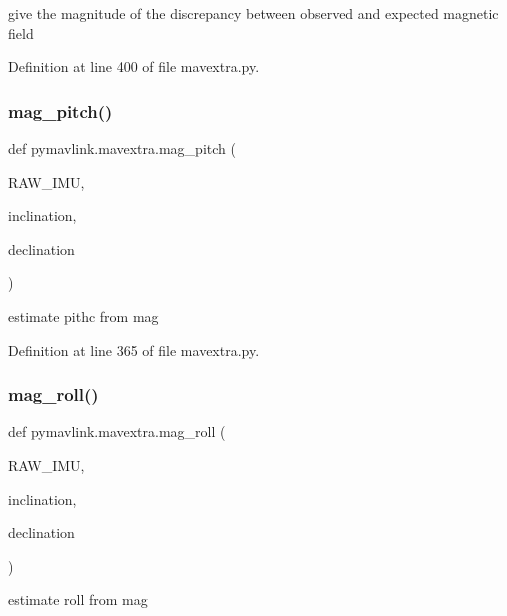\begin{DoxyVerb}give the magnitude of the discrepancy between observed and expected magnetic field\end{DoxyVerb}
 

Definition at line 400 of file mavextra.\+py.

\mbox{\label{namespacepymavlink_1_1mavextra_a34628d19d224246f6da064562dc71b85}} 
\subsubsection{\texorpdfstring{mag\_pitch()}{mag\_pitch()}}
{\footnotesize\ttfamily def pymavlink.\+mavextra.\+mag\+\_\+pitch (\begin{DoxyParamCaption}\item[{}]{R\+A\+W\+\_\+\+I\+MU,  }\item[{}]{inclination,  }\item[{}]{declination }\end{DoxyParamCaption})}

\begin{DoxyVerb}estimate pithc from mag\end{DoxyVerb}
 

Definition at line 365 of file mavextra.\+py.

\mbox{\label{namespacepymavlink_1_1mavextra_ae68ad6b7e203ece0fbb43d292c9e4c31}} 
\subsubsection{\texorpdfstring{mag\_roll()}{mag\_roll()}}
{\footnotesize\ttfamily def pymavlink.\+mavextra.\+mag\+\_\+roll (\begin{DoxyParamCaption}\item[{}]{R\+A\+W\+\_\+\+I\+MU,  }\item[{}]{inclination,  }\item[{}]{declination }\end{DoxyParamCaption})}

\begin{DoxyVerb}estimate roll from mag\end{DoxyVerb}
 

